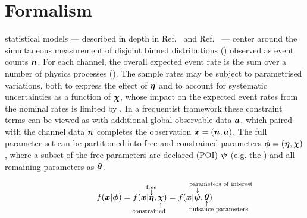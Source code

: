 \section{\HiFa{} Formalism}\label{sec:HistFactory}

\HiFa{} statistical models --- described in depth in Ref.~\cite{ATL-PHYS-PUB-2019-029} and Ref.~\cite{CHEP_2019}  --- center around the simultaneous measurement of disjoint binned distributions () observed as event counts $\bm{n}$.
For each channel, the overall expected event rate is the sum over a number of physics processes ().
The sample rates may be subject to parametrised variations, both to express the effect of  $\bm{\eta}$ and to account for systematic uncertainties as a function of  $\bm{\chi}$, whose impact on the expected event rates from the nominal rates is limited by .
In a frequentist framework these constraint terms can be viewed as  with additional global observable data $\bm{a}$, which paired with the channel data $\bm{n}$ completes the observation $\bm{x} = (\bm{n},\bm{a})$.
The full parameter set can be partitioned into free and constrained parameters $\bm{\phi} = (\bm{\eta},\bm{\chi})$, where a subset of the free parameters are declared  (POI) $\bm{\psi}$ (e.g. the ) and all remaining parameters as  $\bm{\theta}$.

\begin{equation}
 \label{eqn:parameters_partitions}
 f(\bm{x}|\fullset) = f(\bm{x}|\annoterel{free}{\freeset},\annotereldn{constrained\hspace{1cm}}{\constrset}) = f(\bm{x}|\annoterel{\hspace{2cm}parameters of interest}{\poiset},\annotereldn{\hspace{1cm}nuisance parameters}{\nuisset})
\end{equation}

